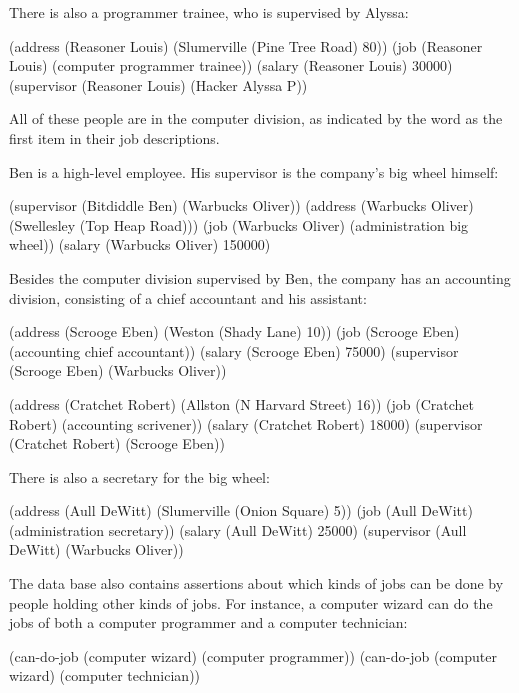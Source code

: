 \noindent
There is also a programmer trainee, who is supervised by Alyssa:

\begin{codeBlock}
(address (Reasoner Louis) (Slumerville (Pine Tree Road) 80))
(job (Reasoner Louis) (computer programmer trainee))
(salary (Reasoner Louis) 30000)
(supervisor (Reasoner Louis) (Hacker Alyssa P))
\end{codeBlock}

\noindent
All of these people are in the computer division, as indicated by the word
 as the first item in their job descriptions.

Ben is a high-level employee.  His supervisor is the company's big wheel
himself:

\begin{codeBlock}
(supervisor (Bitdiddle Ben) (Warbucks Oliver))
(address (Warbucks Oliver) (Swellesley (Top Heap Road)))
(job (Warbucks Oliver) (administration big wheel))
(salary (Warbucks Oliver) 150000)
\end{codeBlock}

\noindent
Besides the computer division supervised by Ben, the company has an accounting
division, consisting of a chief accountant and his assistant:

\begin{codeBlock}
(address (Scrooge Eben) (Weston (Shady Lane) 10))
(job (Scrooge Eben) (accounting chief accountant))
(salary (Scrooge Eben) 75000)
(supervisor (Scrooge Eben) (Warbucks Oliver))

(address (Cratchet Robert) (Allston (N Harvard Street) 16))
(job (Cratchet Robert) (accounting scrivener))
(salary (Cratchet Robert) 18000)
(supervisor (Cratchet Robert) (Scrooge Eben))
\end{codeBlock}

\noindent
There is also a secretary for the big wheel:

\begin{codeBlock}
(address (Aull DeWitt) (Slumerville (Onion Square) 5))
(job (Aull DeWitt) (administration secretary))
(salary (Aull DeWitt) 25000)
(supervisor (Aull DeWitt) (Warbucks Oliver))
\end{codeBlock}

\noindent
The data base also contains assertions about which kinds of jobs can be done by
people holding other kinds of jobs.  For instance, a computer wizard can do the
jobs of both a computer programmer and a computer technician:

\begin{codeBlock}
(can-do-job (computer wizard) (computer programmer))
(can-do-job (computer wizard) (computer technician))
\end{codeBlock}

